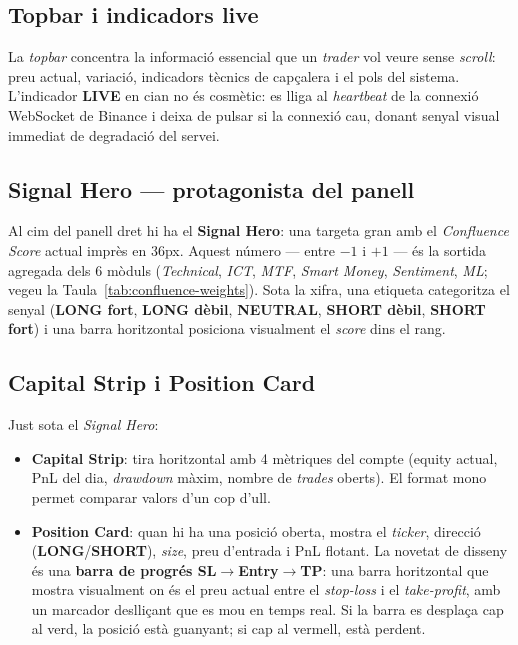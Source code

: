 \documentclass[12pt, a4paper]{report}
\begin{document}
\subsection{Topbar i indicadors live}

La \textit{topbar} concentra la informació essencial que un \textit{trader} vol veure sense \textit{scroll}: preu actual, variació, indicadors tècnics de capçalera i el pols del sistema. L'indicador \textbf{LIVE} en cian no és cosmètic: es lliga al \textit{heartbeat} de la connexió WebSocket de Binance i deixa de pulsar si la connexió cau, donant senyal visual immediat de degradació del servei.

\subsection{Signal Hero --- protagonista del panell}

Al cim del panell dret hi ha el \textbf{Signal Hero}: una targeta gran amb el \textit{Confluence Score} actual imprès en 36px. Aquest número --- entre $-1$ i $+1$ --- és la sortida agregada dels 6 mòduls (\textit{Technical}, \textit{ICT}, \textit{MTF}, \textit{Smart Money}, \textit{Sentiment}, \textit{ML}; vegeu la Taula~\ref{tab:confluence-weights}). Sota la xifra, una etiqueta categoritza el senyal (\textbf{LONG fort}, \textbf{LONG dèbil}, \textbf{NEUTRAL}, \textbf{SHORT dèbil}, \textbf{SHORT fort}) i una barra horitzontal posiciona visualment el \textit{score} dins el rang.

\subsection{Capital Strip i Position Card}

Just sota el \textit{Signal Hero}:

\begin{itemize}
  \item \textbf{Capital Strip}: tira horitzontal amb 4 mètriques del compte (equity actual, PnL del dia, \textit{drawdown} màxim, nombre de \textit{trades} oberts). El format mono permet comparar valors d'un cop d'ull.
  \item \textbf{Position Card}: quan hi ha una posició oberta, mostra el \textit{ticker}, direcció (\textbf{LONG}/\textbf{SHORT}), \textit{size}, preu d'entrada i PnL flotant. La novetat de disseny és una \textbf{barra de progrés SL$\to$Entry$\to$TP}: una barra horitzontal que mostra visualment on és el preu actual entre el \textit{stop-loss} i el \textit{take-profit}, amb un marcador deslliçant que es mou en temps real. Si la barra es desplaça cap al verd, la posició està guanyant; si cap al vermell, està perdent.
\end{itemize}
\end{document}
